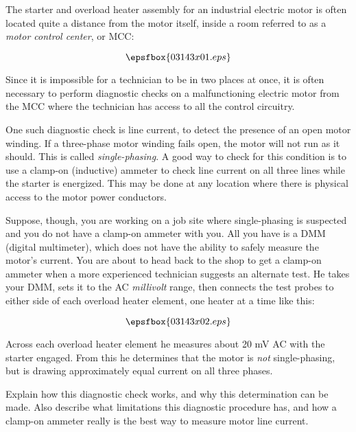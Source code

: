 

The starter and overload heater assembly for an industrial electric motor is often located quite a distance from the motor itself, inside a room referred to as a {\it motor control center}, or MCC:

$$\epsfbox{03143x01.eps}$$

Since it is impossible for a technician to be in two places at once, it is often necessary to perform diagnostic checks on a malfunctioning electric motor from the MCC where the technician has access to all the control circuitry.

One such diagnostic check is line current, to detect the presence of an open motor winding.  If a three-phase motor winding fails open, the motor will not run as it should.  This is called {\it single-phasing}.  A good way to check for this condition is to use a clamp-on (inductive) ammeter to check line current on all three lines while the starter is energized.  This may be done at any location where there is physical access to the motor power conductors.

\goodbreak

Suppose, though, you are working on a job site where single-phasing is suspected and you do not have a clamp-on ammeter with you.  All you have is a DMM (digital multimeter), which does not have the ability to safely measure the motor's current.  You are about to head back to the shop to get a clamp-on ammeter when a more experienced technician suggests an alternate test.  He takes your DMM, sets it to the AC {\it millivolt} range, then connects the test probes to either side of each overload heater element, one heater at a time like this:

$$\epsfbox{03143x02.eps}$$

Across each overload heater element he measures about 20 mV AC with the starter engaged.  From this he determines that the motor is {\it not} single-phasing, but is drawing approximately equal current on all three phases.

Explain how this diagnostic check works, and why this determination can be made.  Also describe what limitations this diagnostic procedure has, and how a clamp-on ammeter really is the best way to measure motor line current.






